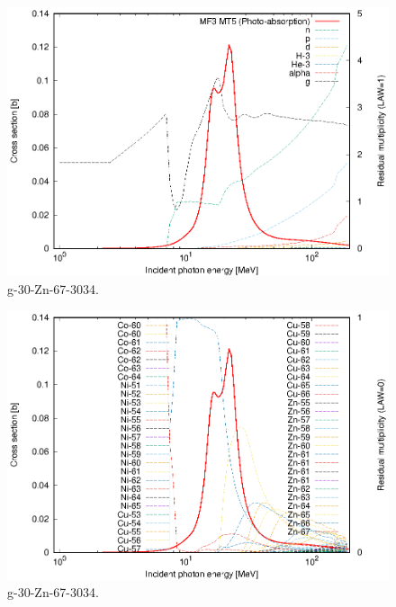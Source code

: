 \begin{figure}
 \includegraphics[width=\linewidth]{eps/g_30-Zn-67_3034.eps}
  \caption{g-30-Zn-67-3034.}
\end{figure}
\begin{figure}
 \includegraphics[width=\linewidth]{eps-law0/g_30-Zn-67_3034.eps}
 \caption{g-30-Zn-67-3034.}
\end{figure}
\newpage \clearpage

